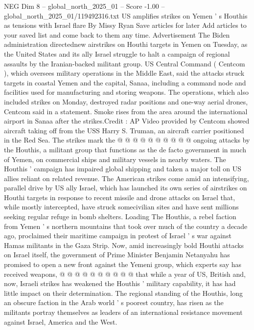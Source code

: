 \begin{textsample}{NEG Dim 8 – global\_north\_2025\_01 – Score -1.00 – global\_north\_2025\_01/119492316.txt}  \label{ex:f8_neg_338}
US amplifies strikes on Yemen ' s Houthis as tensions with Israel flare By Missy Ryan Save articles for later Add articles to your saved list and come back to them any time.
Advertisement The Biden administration directednew airstrikes on Houthi targets in Yemen on Tuesday, as the United States and its ally Israel struggle to halt a campaign of regional assaults by the Iranian-backed militant group.
US Central Command ( Centcom ), which oversees military operations in the Middle East, said the attacks struck targets in coastal Yemen and the capital, Sanaa, including a command node and facilities used for manufacturing and storing weapons.
The operations, which also included strikes on Monday, destroyed radar positions and one-way aerial drones, Centcom said in a statement.
Smoke rises from the area around the international airport in Sanaa after the strikes.Credit : AP Video provided by Centcom showed aircraft taking off from the USS Harry S.
Truman, an aircraft carrier positioned in the Red Sea.
The strikes mark the @ @ @ @ @ @ @ @ @ @ ongoing attacks by the Houthis, a militant group that functions as the de facto government in much of Yemen, on commercial ships and military vessels in nearby waters.
The Houthis ' campaign has impaired global shipping and taken a major toll on US allies reliant on related revenue.
The American strikes come amid an intensifying, parallel drive by US ally Israel, which has launched its own series of airstrikes on Houthi targets in response to recent missile and drone attacks on Israel that, while mostly intercepted, have struck somecivilian sites and have sent millions seeking regular refuge in bomb shelters.
Loading The Houthis, a rebel faction from Yemen ' s northern mountains that took over much of the country a decade ago, proclaimed their maritime campaign in protest of Israel ' s war against Hamas militants in the Gaza Strip.
Now, amid increasingly bold Houthi attacks on Israel itself, the government of Prime Minister Benjamin Netanyahu has promised to open a new front against the Yemeni group, which experts say has received weapons, @ @ @ @ @ @ @ @ @ @ that while a year of US, British and, now, Israeli strikes has weakened the Houthis ' military capability, it has had little impact on their determination.
The regional standing of the Houthis, long an obscure faction in the Arab world ' s poorest country, has risen as the militants portray themselves as leaders of an international resistance movement against Israel, America and the West.

\end{textsample}
